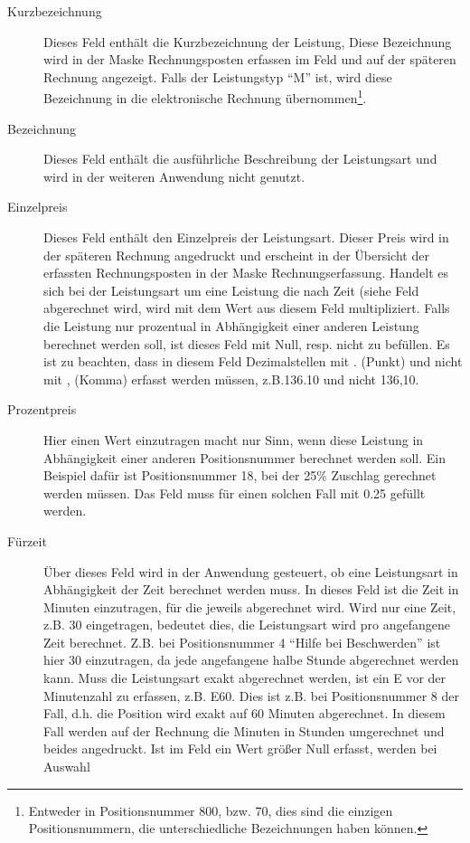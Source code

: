 \begin{description}
\item[Kurzbezeichnung] Dieses Feld enthält die Kurzbezeichnung der Leistung,
Diese Bezeichnung wird in der Maske Rechnungsposten erfassen im Feld
 und auf der späteren Rechnung angezeigt. Falls der
Leistungstyp ``M'' ist, wird diese Bezeichnung in die elektronische 
Rechnung übernommen\footnote{Entweder in Positionsnummer 800, bzw. 70, 
dies sind die einzigen
Positionsnummern, die unterschiedliche Bezeichnungen haben können.}.
\item[Bezeichnung] Dieses Feld enthält die ausführliche Beschreibung der
Leistungsart und wird in der weiteren Anwendung nicht genutzt.
\item[Einzelpreis] Dieses Feld enthält den Einzelpreis der Leistungsart.
Dieser Preis wird in der späteren Rechnung angedruckt und erscheint in
der Übersicht der erfassten Rechnungsposten in der Maske Rechnungserfassung.
Handelt es sich bei der Leistungsart um eine Leistung die nach Zeit (siehe
Feld 
abgerechnet wird, wird mit dem Wert aus diesem Feld multipliziert.
Falls die Leistung nur prozentual in Abhängigkeit einer anderen Leistung
berechnet werden soll, ist dieses Feld mit Null, resp. nicht zu befüllen.
Es ist zu beachten, dass in diesem Feld Dezimalstellen mit . (Punkt) und
nicht mit , (Komma) erfasst werden müssen, z.B.136.10 und nicht 136,10.
\item[Prozentpreis] Hier einen Wert einzutragen macht nur Sinn, wenn diese
Leistung in Abhängigkeit einer anderen Positionsnummer berechnet werden soll.
Ein Beispiel dafür ist Positionsnummer 18, bei der 25\% Zuschlag 
gerechnet werden müssen. Das Feld muss
für einen solchen Fall mit 0.25 gefüllt werden.
\item[Fürzeit] Über dieses Feld wird in der Anwendung gesteuert, ob eine
Leistungsart in Abhängigkeit der Zeit berechnet werden muss. In dieses
Feld ist die Zeit in Minuten einzutragen, für die jeweils abgerechnet wird.
Wird nur eine Zeit, z.B. 30 eingetragen, bedeutet dies, die Leistungsart
wird pro angefangene Zeit berechnet.
Z.B. bei Positionsnummer 4 ``Hilfe bei Beschwerden'' ist hier 30 
einzutragen, da jede angefangene halbe Stunde abgerechnet werden kann.
Muss die Leistungsart exakt abgerechnet werden, ist ein E vor der Minutenzahl
zu erfassen, z.B. E60. Dies ist z.B. bei Positionsnummer 8 der Fall, d.h.
die Position wird exakt auf 60 Minuten abgerechnet. In diesem Fall werden
auf der Rechnung die Minuten in Stunden umgerechnet und beides angedruckt.
Ist im Feld  ein Wert größer Null erfasst, werden bei Auswahl

\end{description}
